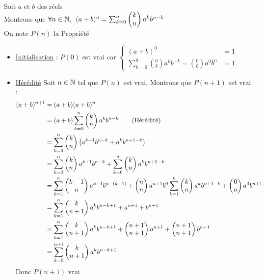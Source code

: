 \begin{dem}
	Soit \(a\) et \(b\) des réels \\
	Montrons que \(\quantifs{\forall n \in \N} (a+b)^n = \sum_{k=0}^n \binom{n}{k} a^{k}b^{n-k} \) \\
	On note \(P(n)\) la Propriété 
	\begin{itemize}
		\item \underline{Initialisation} :
		      \(P(0)\) est vrai car \(\begin{cases}
			      (a+b)^0                                                         & = 1 \\
			      \sum_{k=0}^0 \binom{0}{k} a^{k}b^{-k} = \binom{0}{0} a^{0}b^{0} & = 1
		      \end{cases}\)
		\item \underline{Hérédité}
		      Soit \(n \in \N\) tel que \(P(n)\) est vrai, Montrons que \(P(n+1)\) est vrai :
		      \begin{align*}
			      (a+b)^{n+1} & = (a+b)(a+b)^n                                                                                                                            \\
			                  & = (a+b) \sum_{k=0}^n \binom{n}{k} a^{k}b^{n-k} \qquad \text{(Hérédité)}                                                                   \\
			                  & = \sum_{k=0}^n \binom{n}{k}  \paren{a^{k+1}b^{n-k}+a^{k}b^{n+1-k}}                                                                        \\
			                  & =\sum_{k=0}^n \binom{n}{k}  a^{k+1}b^{n-k}+ \sum_{k=0}^n \binom{n}{k}a^{k}b^{n+1-k}                                                       \\
			                  & = \sum_{k=1}^n \binom{n}{k-1}  a^{k+1}b^{n-(k-1)}+\binom{n}{n}a^{n+1}b^0 \sum_{k=1}^n \binom{n}{k}a^{k}b^{n+1-k} + \binom{n}{0}a^0b^{n+1} \\
			                  & = \sum_{k=1}^n \binom{n+1}{k} a^kb^{n-k+1} + a^{n+1}+ b^{n+1}                                                                             \\
			                  & = \sum_{k=1}^n \binom{n+1}{k} a^kb^{n-k+1} + \binom{n+1}{n+1}a^{n+1}+ \binom{n+1}{n+1}b^{n+1}                                             \\
			                  & = \sum_{k=0}^{n+1} \binom{n+1}{k} a^kb^{n-k+1}
		      \end{align*}
		      Donc \(P(n+1)\) vrai
	\end{itemize}
\end{dem}

